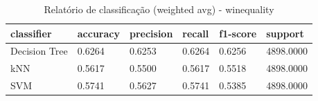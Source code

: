 \begin{table}[htbp]
\centering
\begin{tabular}{llllll}
\hline
classifier & accuracy & precision & recall & f1-score & support \\
\hline
Decision Tree & 0.6264 & 0.6253 & 0.6264 & 0.6256 & 4898.0000 \\
kNN & 0.5617 & 0.5500 & 0.5617 & 0.5518 & 4898.0000 \\
SVM & 0.5741 & 0.5627 & 0.5741 & 0.5385 & 4898.0000 \\
\hline
\end{tabular}
\caption{Relatório de classificação (weighted avg) - winequality}
\label{tab:ex3-winequality-classification-report}
\end{table}